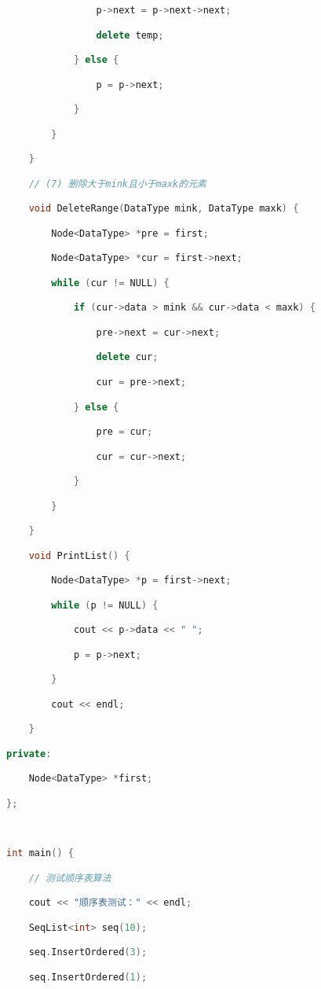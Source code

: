 \begin{lstlisting}[language=C++]
                p->next = p->next->next;

                delete temp;

            } else {

                p = p->next;

            }

        }

    }

    // (7) 删除大于mink且小于maxk的元素

    void DeleteRange(DataType mink, DataType maxk) {

        Node<DataType> *pre = first;

        Node<DataType> *cur = first->next;

        while (cur != NULL) {

            if (cur->data > mink && cur->data < maxk) {

                pre->next = cur->next;

                delete cur;

                cur = pre->next;

            } else {

                pre = cur;

                cur = cur->next;

            }

        }

    }

    void PrintList() {

        Node<DataType> *p = first->next;

        while (p != NULL) {

            cout << p->data << " ";

            p = p->next;

        }

        cout << endl;

    }

private:

    Node<DataType> *first;

};

  

int main() {

    // 测试顺序表算法

    cout << "顺序表测试：" << endl;

    SeqList<int> seq(10);

    seq.InsertOrdered(3);

    seq.InsertOrdered(1);


\end{lstlisting}

